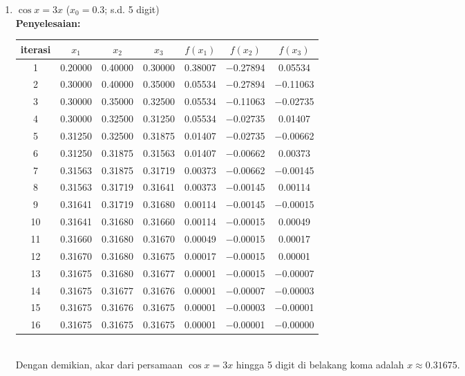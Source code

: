 \documentclass{article}
\newcommand{\penyelesaian}{\textbf{Penyelesaian: }}
\begin{document}
\begin{enumerate}
\begin{enumerate}
        \item $\cos{x} = 3x$ ($x_0 = \num{0,3}$; s.d. 5 digit) \\
        \penyelesaian \\
        \begin{tabular}{|c|c|c|c|c|c|c|}
            \hline
            iterasi & $x_1$ & $x_2$ & $x_3$ & $f(x_1)$ & $f(x_2)$ & $f(x_3)$ \\
            \hline
            1 & \num{0,20000} & \num{0,40000} & \num{0,30000} & \num{0,38007} & \num{-0,27894} & \num{0,05534}\\
            2 & \num{0,30000} & \num{0,40000} & \num{0,35000} & \num{0,05534} & \num{-0,27894} & \num{-0,11063}\\
            3 & \num{0,30000} & \num{0,35000} & \num{0,32500} & \num{0,05534} & \num{-0,11063} & \num{-0,02735}\\
            4 & \num{0,30000} & \num{0,32500} & \num{0,31250} & \num{0,05534} & \num{-0,02735} & \num{0,01407}\\
            5 & \num{0,31250} & \num{0,32500} & \num{0,31875} & \num{0,01407} & \num{-0,02735} & \num{-0,00662}\\
            6 & \num{0,31250} & \num{0,31875} & \num{0,31563} & \num{0,01407} & \num{-0,00662} & \num{0,00373}\\
            7 & \num{0,31563} & \num{0,31875} & \num{0,31719} & \num{0,00373} & \num{-0,00662} & \num{-0,00145}\\
            8 & \num{0,31563} & \num{0,31719} & \num{0,31641} & \num{0,00373} & \num{-0,00145} & \num{0,00114}\\
            9 & \num{0,31641} & \num{0,31719} & \num{0,31680} & \num{0,00114} & \num{-0,00145} & \num{-0,00015}\\
            10 & \num{0,31641} & \num{0,31680} & \num{0,31660} & \num{0,00114} & \num{-0,00015} & \num{0,00049}\\
            11 & \num{0,31660} & \num{0,31680} & \num{0,31670} & \num{0,00049} & \num{-0,00015} & \num{0,00017}\\
            12 & \num{0,31670} & \num{0,31680} & \num{0,31675} & \num{0,00017} & \num{-0,00015} & \num{0,00001}\\
            13 & \num{0,31675} & \num{0,31680} & \num{0,31677} & \num{0,00001} & \num{-0,00015} & \num{-0,00007}\\
            14 & \num{0,31675} & \num{0,31677} & \num{0,31676} & \num{0,00001} & \num{-0,00007} & \num{-0,00003}\\
            15 & \num{0,31675} & \num{0,31676} & \num{0,31675} & \num{0,00001} & \num{-0,00003} & \num{-0,00001}\\
            16 & \num{0,31675} & \num{0,31675} & \num{0,31675} & \num{0,00001} & \num{-0,00001} & \num{-0,00000}\\
             \hline
            \end{tabular} \\                     
        Dengan demikian, akar dari persamaan $\cos{x} = 3x$ hingga 5 digit di belakang koma adalah $x \approx \num{0,31675}$.


\end{enumerate}
\end{enumerate}
\end{document}

